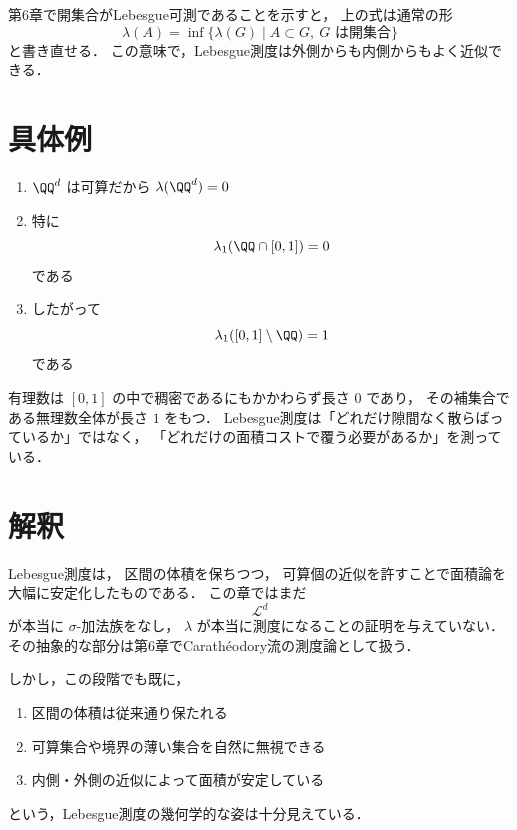 \begin{remark}
第6章で開集合がLebesgue可測であることを示すと，
上の式は通常の形
\[
\lambda(A)
=
\inf\{\lambda(G)\mid A \subset G,\ G \text{ は開集合}\}
\]
と書き直せる．
この意味で，Lebesgue測度は外側からも内側からもよく近似できる．
\end{remark}

\section{具体例}

\begin{example}
\begin{enumerate}
    \item $\QQ^d$ は可算だから $\lambda(\QQ^d)=0$
    \item 特に
    \[
    \lambda_1(\QQ \cap [0,1])=0
    \]
    である
    \item したがって
    \[
    \lambda_1([0,1]\setminus \QQ)=1
    \]
    である
\end{enumerate}
\end{example}

\begin{remark}
有理数は $[0,1]$ の中で稠密であるにもかかわらず長さ $0$ であり，
その補集合である無理数全体が長さ $1$ をもつ．
Lebesgue測度は「どれだけ隙間なく散らばっているか」ではなく，
「どれだけの面積コストで覆う必要があるか」を測っている．
\end{remark}

\section{解釈}

Lebesgue測度は，
区間の体積を保ちつつ，
可算個の近似を許すことで面積論を大幅に安定化したものである．
この章ではまだ
\[
\mathcal L^d
\]
が本当に $\sigma$-加法族をなし，
$\lambda$ が本当に測度になることの証明を与えていない．
その抽象的な部分は第6章でCarathéodory流の測度論として扱う．

しかし，この段階でも既に，
\begin{enumerate}
    \item 区間の体積は従来通り保たれる
    \item 可算集合や境界の薄い集合を自然に無視できる
    \item 内側・外側の近似によって面積が安定している
\end{enumerate}
という，Lebesgue測度の幾何学的な姿は十分見えている．
